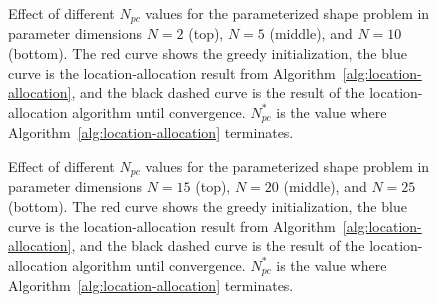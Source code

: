 \begin{figure}
    \centering
    \vspace{-20pt}
    \begin{subfigure}[b]{\textwidth}
    \end{subfigure}
    \begin{subfigure}[b]{\textwidth}
        \vspace{-20pt}
    \end{subfigure}
    \begin{subfigure}[b]{\textwidth}
        \vspace{-20pt}
    \end{subfigure}
    \caption{
        Effect of different $N_{pc}$ values for the parameterized shape problem in parameter dimensions $N=2$ (top), $N=5$ (middle), and $N=10$ (bottom).
        The red curve shows the greedy initialization, the blue curve is the location-allocation result from Algorithm~\ref{alg:location-allocation}, and the black dashed curve is the result of the location-allocation algorithm until convergence.
        $N_{pc}^*$ is the value where Algorithm~\ref{alg:location-allocation} terminates.
    }
    \label{fig:Npc_tikz_2_5_10}
\end{figure}

\begin{figure}
    \centering
    \vspace{-20pt}
    \begin{subfigure}[b]{\textwidth}
    \end{subfigure}
    \begin{subfigure}[b]{\textwidth}
        \vspace{-20pt}
    \end{subfigure}
    \begin{subfigure}[b]{\textwidth}
        \vspace{-20pt}
    \end{subfigure}
    \caption{
        Effect of different $N_{pc}$ values for the parameterized shape problem in parameter dimensions $N=15$ (top), $N=20$ (middle), and $N=25$ (bottom).
        The red curve shows the greedy initialization, the blue curve is the location-allocation result from Algorithm~\ref{alg:location-allocation}, and the black dashed curve is the result of the location-allocation algorithm until convergence.
        $N_{pc}^*$ is the value where Algorithm~\ref{alg:location-allocation} terminates.
    }
    \label{fig:Npc_tikz_15_20_25}
\end{figure}

